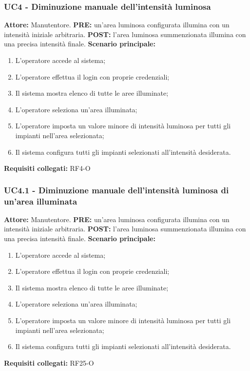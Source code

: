 \documentclass[a4paper, 12pt]{article}
\begin{document}
\subsubsection{UC4 - Diminuzione manuale dell'intensità luminosa}
\textbf{Attore:} Manutentore.\newline
\textbf{PRE:} un'area luminosa configurata illumina con un intensità iniziale arbitraria.\newline
\textbf{POST:} l'area luminosa summenzionata illumina con una precisa intensità finale.\newline
\textbf{Scenario principale:}
\begin{enumerate}
    \item L'operatore accede al sistema;
    \item L'operatore effettua il login con proprie credenziali;
    \item Il sistema mostra elenco di tutte le aree illuminate;
    \item L'operatore seleziona un'area illuminata;
    \item L'operatore imposta un valore minore di intensità luminosa per tutti gli impianti nell'area selezionata;
    \item Il sistema configura tutti gli impianti selezionati all'intensità desiderata.
\end{enumerate}
\textbf{Requisiti collegati:} RF4-O\newline

\subsubsection{UC4.1 - Diminuzione manuale dell'intensità luminosa di un'area illuminata}
\textbf{Attore:} Manutentore.\newline
\textbf{PRE:} un'area luminosa configurata illumina con un intensità iniziale arbitraria.\newline
\textbf{POST:} l'area luminosa summenzionata illumina con una precisa intensità finale.\newline
\textbf{Scenario principale:}
\begin{enumerate}
    \item L'operatore accede al sistema;
    \item L'operatore effettua il login con proprie credenziali;
    \item Il sistema mostra elenco di tutte le aree illuminate;
    \item L'operatore seleziona un'area illuminata;
    \item L'operatore imposta un valore minore di intensità luminosa per tutti gli impianti nell'area selezionata;
    \item Il sistema configura tutti gli impianti selezionati all'intensità desiderata.
\end{enumerate}
\textbf{Requisiti collegati:} RF25-O\newline
\end{document}
